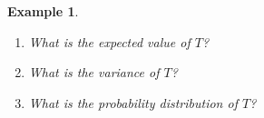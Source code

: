 \documentclass[12pt]{amsart}
\newtheorem{example}[theorem]{Example}
\begin{document}
{\begin{example}
\begin{enumerate}
\vspace{2cm}

\item What is the expected value of $T$?

\vspace{3.5cm}

\item What is the variance of $T$?

\vspace{4cm}
%


\item What is the probability distribution of $T$?


\end{enumerate}


\end{example} 





}  %
\end{document}
